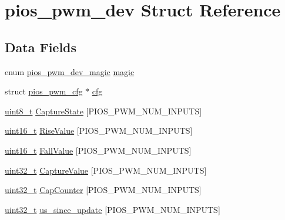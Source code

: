 \hypertarget{structpios__pwm__dev}{\section{pios\-\_\-pwm\-\_\-dev Struct Reference}
\label{structpios__pwm__dev}
}
\subsection*{Data Fields}
\begin{DoxyCompactItemize}
\item 
enum \hyperlink{group___p_i_o_s___p_w_m_ga42d376e6bd816a93a35efb03226d676e}{pios\-\_\-pwm\-\_\-dev\-\_\-magic} \hyperlink{structpios__pwm__dev_a30184bc599b287648e5b2430590a2057}{magic}
\item 
struct \hyperlink{structpios__pwm__cfg}{pios\-\_\-pwm\-\_\-cfg} $\ast$ \hyperlink{structpios__pwm__dev_a879902a1111b771fe171269e1db3a537}{cfg}
\item 
\hyperlink{stdint_8h_aba7bc1797add20fe3efdf37ced1182c5}{uint8\-\_\-t} \hyperlink{structpios__pwm__dev_a31387dc44557e705dc17b4a12313b6a5}{Capture\-State} \mbox{[}P\-I\-O\-S\-\_\-\-P\-W\-M\-\_\-\-N\-U\-M\-\_\-\-I\-N\-P\-U\-T\-S\mbox{]}
\item 
\hyperlink{stdint_8h_a273cf69d639a59973b6019625df33e30}{uint16\-\_\-t} \hyperlink{structpios__pwm__dev_ab54467e66397e1470fcda91714768c18}{Rise\-Value} \mbox{[}P\-I\-O\-S\-\_\-\-P\-W\-M\-\_\-\-N\-U\-M\-\_\-\-I\-N\-P\-U\-T\-S\mbox{]}
\item 
\hyperlink{stdint_8h_a273cf69d639a59973b6019625df33e30}{uint16\-\_\-t} \hyperlink{structpios__pwm__dev_ad3484d9d98fd9b11c7abca2cdd9c9ee0}{Fall\-Value} \mbox{[}P\-I\-O\-S\-\_\-\-P\-W\-M\-\_\-\-N\-U\-M\-\_\-\-I\-N\-P\-U\-T\-S\mbox{]}
\item 
\hyperlink{stdint_8h_a435d1572bf3f880d55459d9805097f62}{uint32\-\_\-t} \hyperlink{structpios__pwm__dev_a4636d6e2c328194059cdaecd349b117a}{Capture\-Value} \mbox{[}P\-I\-O\-S\-\_\-\-P\-W\-M\-\_\-\-N\-U\-M\-\_\-\-I\-N\-P\-U\-T\-S\mbox{]}
\item 
\hyperlink{stdint_8h_a435d1572bf3f880d55459d9805097f62}{uint32\-\_\-t} \hyperlink{structpios__pwm__dev_aef85196929d283f9a4925ebd3b353b5f}{Cap\-Counter} \mbox{[}P\-I\-O\-S\-\_\-\-P\-W\-M\-\_\-\-N\-U\-M\-\_\-\-I\-N\-P\-U\-T\-S\mbox{]}
\item 
\hyperlink{stdint_8h_a435d1572bf3f880d55459d9805097f62}{uint32\-\_\-t} \hyperlink{structpios__pwm__dev_a7a992a8b90e3ff0cfa62b69a5157e34e}{us\-\_\-since\-\_\-update} \mbox{[}P\-I\-O\-S\-\_\-\-P\-W\-M\-\_\-\-N\-U\-M\-\_\-\-I\-N\-P\-U\-T\-S\mbox{]}
\end{DoxyCompactItemize}


